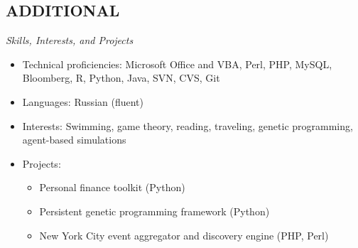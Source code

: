 \documentclass{res}
\begin{document}
\begin{resume}
\section{ADDITIONAL} 
\vspace{1pt}
{\sl Skills, Interests, and Projects}
\begin{itemize} \itemsep -2pt
  \item Technical proficiencies: Microsoft Office and VBA, Perl, PHP, MySQL, Bloomberg, R, Python, Java, SVN, CVS, Git
  \item Languages: Russian (fluent)
  \item Interests: Swimming, game theory, reading, traveling, genetic programming, agent-based simulations
  \item Projects: \vspace{-6pt}
    \begin{itemize} \itemsep -2pt
    \item Personal finance toolkit (Python)
    \item Persistent genetic programming framework (Python)
    \item New York City event aggregator and discovery engine (PHP, Perl)
    \end{itemize} \vspace{0px}
\end{itemize} \vspace{0px}

\end{resume} 
\end{document}

